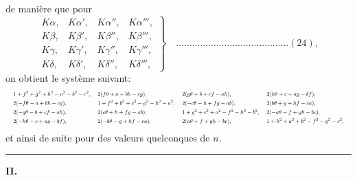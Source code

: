 \documentclass[12pt,a4paper]{article}
\theoremstyle{plain}
\begin{document}
de mani\`ere que pour
\[
\left. \begin{array}{cccc}
K\alpha, & K\alpha', & K\alpha'', & K\alpha''', \\
K\beta, & K\beta', & K\beta'', & K\beta''', \\
K\gamma, & K\gamma', & K\gamma'', & K\gamma''', \\
K\delta, & K\delta', & K\delta'', & K\delta''',
\end{array} \right\} \quad \ldots \ldots \ldots \ldots \ldots \ldots \ldots \ldots \ldots \ldots \ldots \ldots \ldots \ldots (24),
\]
on obtient le syst\`eme suivant:
\[
\resizebox{\textwidth}{!}{$
\begin{aligned}
&1 + f^2 + g^2 + h^2 - a^2 - b^2 - c^2,\ &&2(f\theta + a + bh - cg),\ &&2(g\theta + b + cf - ah),\ &&2(h\theta + c + ag - bf), \\
&2(-f\theta - a + bh - cg),\ &&1 + f^2 + b^2 + c^2 - g^2 - h^2 - a^2,\ &&2(-c\theta - h + fg - ab),\ &&2(b\theta + g + hf - ca), \\
&2(-g\theta - b + cf - ah),\ &&2(c\theta + h + fg - ab),\ &&1 + g^2 + c^2 + a^2 - f^2 - h^2 - b^2,\ &&2(-a\theta - f + gh - bc), \\
&2(-h\theta - c + ag - bf),\ &&2(-b\theta - g + hf - ca),\ &&2(a\theta + f + gh - bc),\ &&1 + h^2 + a^2 + b^2 - f^2 - g^2 - c^2,
\end{aligned}
$}
\]
et ainsi de suite pour des valeurs quelconques de $n$.

\medskip
\hrule
\medskip

\textbf{II.}
\end{document}
